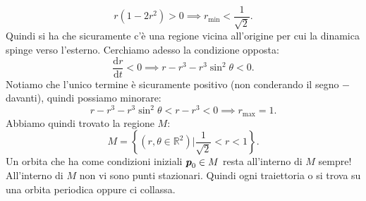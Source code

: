 \begin{ex}
    \[
	r(1-2r^2) > 0 \implies  r_{\text{min}} < \frac{1}{\sqrt{2}}
    .\] 
    Quindi si ha che sicuramente c'è una regione vicina all'origine per cui la dinamica spinge verso l'esterno. Cerchiamo adesso la condizione opposta:
    \[
        \frac{\text{d} r}{\text{d} t} < 0 \implies  r - r^3-r^3\sin^2\theta  < 0
    .\] 
    Notiamo che l'unico termine è sicuramente positivo (non conderando il segno $-$ davanti), quindi possiamo minorare:
    \[
        r-r^3-r^3\sin^2\theta  < r-r^3 < 0 \implies  r_{\text{max}} = 1
    .\] 
    Abbiamo quindi trovato la regione $M$:
    \[
	M = \left\{(r, \theta\in \mathbb{R}^2) | \frac{1}{\sqrt{2}} < r < 1\right\}
    .\] 
    Un orbita che ha come condizioni iniziali $\boldsymbol{p}_0\in M$ resta all'interno di $M$ sempre!\\
    All'interno di $M$ non vi sono punti stazionari. Quindi ogni traiettoria o si trova su una orbita periodica oppure ci collassa.
\end{ex}
\noindent
